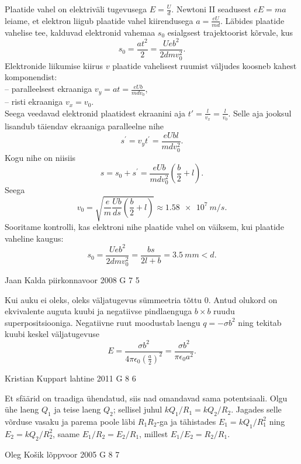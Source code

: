\documentclass[11pt, twoside]{article}
\begin{document}
{{Plaatide vahel on elektriväli tugevusega $E = \frac{U}{d}$. Newtoni II seadusest $eE = ma$ leiame, et elektron liigub plaatide vahel kiirendusega $a = \frac{eU}{md}$. Läbides plaatide vahelise tee, kalduvad elektronid vahemaa $s_0$ esialgsest trajektoorist kõrvale, kus
\[
s_{0}=\frac{a t^{2}}{2}=\frac{U e b^{2}}{2 d m v_{0}^{2}}.
\]
Elektronide liikumise kiirus $v$ plaatide vahelisest ruumist väljudes koosneb kahest komponendist:\\
-- paralleelsest ekraaniga $v_{y}=a t=\frac{e U b}{m d v_{0}}$,\\
-- risti ekraaniga $v_x = v_0$.\\
Seega veedavad elektronid plaatidest ekraanini aja $t' = \frac{l}{v_x} = \frac{l}{v_0}$. Selle aja jooksul lisandub täiendav ekraaniga paralleelne nihe
\[
s^{\prime}=v_{y} t^{\prime}=\frac{e U b l}{m d v_{0}^{2}}.
\]
Kogu nihe on niisiis
\[
s=s_{0}+s^{\prime}=\frac{e U b}{m d v_{0}^{2}}\left(\frac{b}{2}+l\right).
\]
Seega
\[
v_{0}=\sqrt{\frac{e}{m} \frac{U b}{d s}\left(\frac{b}{2}+l\right)} \approx \SI{1,58e7}{m/s}.
\]
Sooritame kontrolli, kas elektroni nihe plaatide vahel on väiksem, kui plaatide vaheline kaugus:
\[
s_{0}=\frac{U e b^{2}}{2 d m v_{0}^{2}}=\frac{bs}{2l + b} = \SI{3.5}{mm} < d.
\] 
\fi
}

{Jaan Kalda} %
{piirkonnavoor} %
{2008} %
{G 7} %
{5} %
{

\ifSolution
Kui auku ei oleks, oleks väljatugevus sümmeetria tõttu 0. Antud olukord on ekvivalente auguta kuubi ja negatiivse pindlaenguga $b\times b$ ruudu superpositsiooniga. Negatiivne ruut moodustab laengu $q = -\sigma b^2$ ning tekitab kuubi keskel väljatugevuse
\[
E=\frac{\sigma b^{2}}{4\pi \epsilon_{0} \left(\frac{a}{2}\right)^{2}} = \frac{\sigma b^{2}}{\pi \epsilon_{0} a^{2}}.
\]
\fi
}

{Kristian Kuppart} %
{lahtine} %
{2011} %
{G 8} %
{6} %
{

\ifSolution
Et sfäärid on traadiga ühendatud, siis nad omandavad sama potentsiaali. Olgu ühe laeng $Q_1$ ja teise laeng $Q_2$;
sellisel juhul $kQ_1/R_1=kQ_2/R_2$. Jagades selle võrduse vasaku ja parema poole läbi $R_1R_2$-ga ja tähistades $E_1=kQ_1/R_1^2$ ning
$E_2=kQ_2/R_2^2$, saame $E_1/R_2 = E_2/R_1$, millest $E_1/E_2=R_2/R_1$.
\fi
}

{Oleg Košik} %
{lõppvoor} %
{2005} %
{G 8} %
{7} %
{

}}
\end{document}
